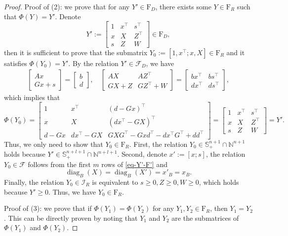\documentclass[10pt,a4paper]{amsart}
\def\F{\mathcal{F}}
\def\I{\mathcal{I}}
\def\S{\mathbb{S}}
\begin{document}
\begin{proof}
\noindent Proof of (2): we prove that for any $Y'\in{\mathrm{F}_D}$, there exists some $Y\in{\mathrm{F}_R}$ such that $\Phi(Y)=Y'$. Denote
\[
Y':=\begin{bmatrix}
1&x^\top&s^\top\\
x&X&Z^\top\\
s&Z&W
\end{bmatrix}\in {\mathrm{F}_D},
\] 
then it is sufficient to prove that the submatrix $Y_0:=[1, x^\top; x, X] \in{\mathrm{F}_R}$ and it satisfies $\Phi(Y_0)=Y'$. By the relation $Y'\in\F_D$, we have 
\begin{equation}\label{eq-Y'-F'}
\begin{aligned}
\begin{bmatrix}
Ax\\
Gx+s
\end{bmatrix}
=\begin{bmatrix}
b\\
d
\end{bmatrix}
,\quad \begin{bmatrix}
AX&AZ^\top\\
GX+Z&GZ^\top+W
\end{bmatrix}
=\begin{bmatrix}
bx^\top&bs^\top\\
dx^\top&ds^\top
\end{bmatrix},
\end{aligned}
\end{equation}
which implies that
\[
\Phi(Y_0)=\begin{bmatrix}
             1&x^\top&(d-Gx)^\top\\
             x&X&(dx^\top-GX)^\top\\
             d-Gx&dx^\top-GX&GXG^\top -Gxd^\top -dx^\top G^\top +dd^\top
         \end{bmatrix}
=\begin{bmatrix}
1&x^\top&s^\top\\
x&X&Z^\top\\
s&Z&W
\end{bmatrix}=Y'.
\]
Thus, we only need to show that $Y_0\in{\mathrm{F}_R}$.
First, the relation $Y_0\in\S^{n+1}_+\cap\mathbb{N}^{n+1}$ holds because $Y'\in\S^{n+l+1}_+\cap\mathbb{N}^{n+l+1}$. Second, denote $x':=[x;s]$, the relation $Y_0\in\F$ follows from the first $m$ rows of \eqref{eq-Y'-F'} and 
\[
\operatorname{diag}_B(X)=\operatorname{diag}_B(X')=x'_B=x_B.
\]
Finally, the relation $Y_0\in\I_R$ is equivalent to $s\geq0, Z\geq 0, W\geq 0$, which holds because $Y'\geq 0$. Thus, we have $Y_0\in{\mathrm{F}_R}$.
\smallskip

\noindent Proof of (3): we prove that if $\Phi(Y_1)=\Phi(Y_2)$ for any $Y_1,Y_2\in{\mathrm{F}_R}$, then $Y_1=Y_2$.
This can be directly proven by noting that $Y_1$ and $Y_2$ are the submatrices of $\Phi(Y_1)$ and $\Phi(Y_2)$.
\end{proof}
\end{document}
